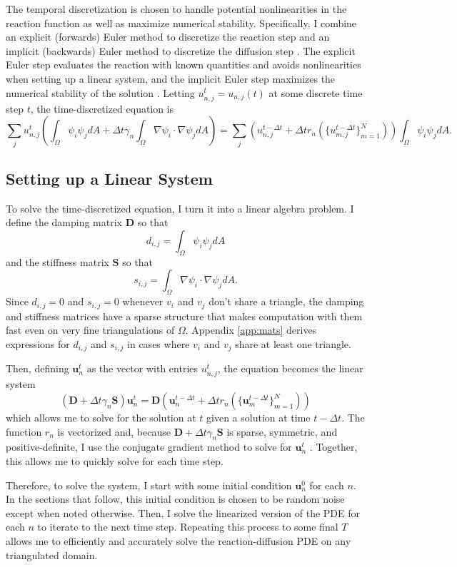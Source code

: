 The temporal discretization is chosen to handle potential nonlinearities in the reaction function as well as maximize numerical stability. Specifically, I combine an explicit (forwards) Euler method to discretize the reaction step and an implicit (backwards) Euler method to discretize the diffusion step \parencite{sellami2020accelerating}. The explicit Euler step evaluates the reaction with known quantities and avoids nonlinearities when setting up a linear system, and the implicit Euler step maximizes the numerical stability of the solution \parencite{folland2020introduction}. Letting $u_{n, j}^t = u_{n, j}(t)$ at some discrete time step $t$, the time-discretized equation is
\[
    \sum_j u_{n, j}^t \left(\int_\Omega \psi_i \psi_j dA + \Delta t \gamma_n \int_\Omega \nabla \psi_i \cdot \nabla \psi_j dA\right) = \sum_j \left(u_{n, j}^{t - \Delta t} + \Delta t r_n \left(\{u_{m, j}^{t - \Delta t}\}_{m = 1}^N\right)\right) \int_\Omega \psi_i \psi_j dA.
\]


\subsection{Setting up a Linear System}

To solve the time-discretized equation, I turn it into a linear algebra problem. I define the damping matrix $\mathbf{D}$ so that
\[
    d_{i, j} = \int_\Omega \psi_i \psi_j dA
\]
and the stiffness matrix $\mathbf{S}$ so that
\[
    s_{i, j} = \int_\Omega \nabla \psi_i \cdot \nabla \psi_j dA.
\]
Since $d_{i, j} = 0$ and $s_{i, j} = 0$ whenever $v_i$ and $v_j$ don't share a triangle, the damping and stiffness matrices have a sparse structure that makes computation with them fast even on very fine triangulations of $\Omega$. Appendix \ref{app:mats} derives expressions for $d_{i, j}$ and $s_{i, j}$ in cases where $v_i$ and $v_j$ share at least one triangle.

Then, defining $\mathbf{u}_n^t$ as the vector with entries $u_{n, j}^t$, the equation becomes the linear system
\[
    \left(\mathbf{D} + \Delta t \gamma_n \mathbf{S}\right) \mathbf{u}_n^t = \mathbf{D} \left(\mathbf{u}_n^{t - \Delta t} + \Delta t r_n \left(\{\mathbf{u}_m^{t - \Delta t}\}_{m = 1}^N\right)\right)
\]
which allows me to solve for the solution at $t$ given a solution at time $t - \Delta t$. The function $r_n$ is vectorized and, because $\mathbf{D} + \Delta t \gamma_n \mathbf{S}$ is sparse, symmetric, and positive-definite, I use the conjugate gradient method to solve for $\mathbf{u}_n^t$ \parencite{nazareth2009conjugate}. Together, this allows me to quickly solve for each time step.

Therefore, to solve the system, I start with some initial condition $\mathbf{u}_n^0$ for each $n$. In the sections that follow, this initial condition is chosen to be random noise except when noted otherwise. Then, I solve the linearized version of the PDE for each $n$ to iterate to the next time step. Repeating this process to some final $T$ allows me to efficiently and accurately solve the reaction-diffusion PDE on any triangulated domain.
